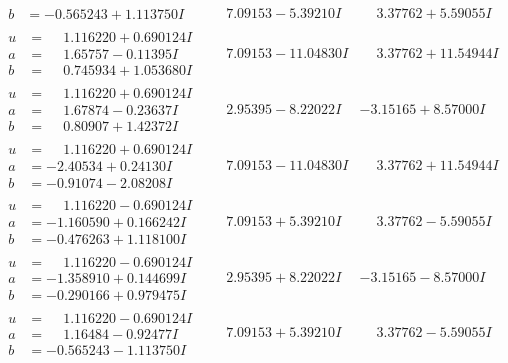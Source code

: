 \documentclass[1p]{elsarticle_modified}
\theoremstyle{definition}
\begin{document}
$$\begin{array}{c|c|c}
\begin{aligned}
b &= -0.565243 + 1.113750 I\end{aligned}
 & \phantom{-}7.09153 - 5.39210 I & \phantom{-}3.37762 + 5.59055 I \\ \hline\begin{aligned}
u &= \phantom{-}1.116220 + 0.690124 I \\
a &= \phantom{-}1.65757 - 0.11395 I \\
b &= \phantom{-}0.745934 + 1.053680 I\end{aligned}
 & \phantom{-}7.09153 - 11.04830 I & \phantom{-}3.37762 + 11.54944 I \\ \hline\begin{aligned}
u &= \phantom{-}1.116220 + 0.690124 I \\
a &= \phantom{-}1.67874 - 0.23637 I \\
b &= \phantom{-}0.80907 + 1.42372 I\end{aligned}
 & \phantom{-}2.95395 - 8.22022 I & -3.15165 + 8.57000 I \\ \hline\begin{aligned}
u &= \phantom{-}1.116220 + 0.690124 I \\
a &= -2.40534 + 0.24130 I \\
b &= -0.91074 - 2.08208 I\end{aligned}
 & \phantom{-}7.09153 - 11.04830 I & \phantom{-}3.37762 + 11.54944 I \\ \hline\begin{aligned}
u &= \phantom{-}1.116220 - 0.690124 I \\
a &= -1.160590 + 0.166242 I \\
b &= -0.476263 + 1.118100 I\end{aligned}
 & \phantom{-}7.09153 + 5.39210 I & \phantom{-}3.37762 - 5.59055 I \\ \hline\begin{aligned}
u &= \phantom{-}1.116220 - 0.690124 I \\
a &= -1.358910 + 0.144699 I \\
b &= -0.290166 + 0.979475 I\end{aligned}
 & \phantom{-}2.95395 + 8.22022 I & -3.15165 - 8.57000 I \\ \hline\begin{aligned}
u &= \phantom{-}1.116220 - 0.690124 I \\
a &= \phantom{-}1.16484 - 0.92477 I \\
b &= -0.565243 - 1.113750 I\end{aligned}
 & \phantom{-}7.09153 + 5.39210 I & \phantom{-}3.37762 - 5.59055 I \\ \hline\begin{aligned}

\end{aligned}
\end{array}$$
\end{document}
